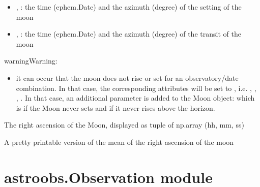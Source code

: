 \documentclass[letterpaper,10pt,english]{sphinxmanual}
\begin{document}
\begin{fulllineitems}
\begin{fulllineitems}
\begin{description}
\begin{itemize}
\item {} 
, : the time (ephem.Date) and the azimuth (degree) of the setting of the moon

\item {} 
, : the time (ephem.Date) and the azimuth (degree) of the transit of the moon

\end{itemize}

\end{description}

\begin{notice}{warning}{Warning:}\begin{itemize}
\item {} 
it can occur that the moon does not rise or set for an observatory/date combination. In that case, the corresponding attributes will be set to , i.e. , , , . In that case, an additional parameter is added to the Moon object:  which is  if the Moon never sets and  if it never rises above the horizon.

\end{itemize}
\end{notice}

\end{fulllineitems}


\begin{fulllineitems}
\label{astroobs:astroobs.Moon.Moon.ra}
The right ascension of the Moon, displayed as tuple of np.array (hh, mm, ss)

\end{fulllineitems}


\begin{fulllineitems}
\label{astroobs:astroobs.Moon.Moon.raStr}
A pretty printable version of the mean of the right ascension of the moon

\end{fulllineitems}


\end{fulllineitems}



\section{astroobs.Observation module}
\label{astroobs:astroobs-observation-module}\label{astroobs:module-astroobs.Observation}
\end{document}
